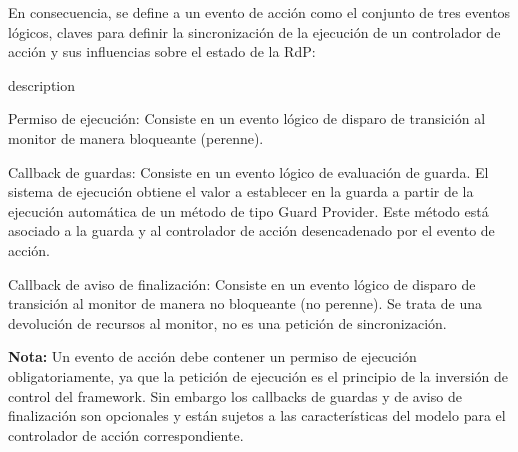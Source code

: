 En consecuencia, se define a un evento de acción como el conjunto de tres
eventos lógicos, claves para definir la sincronización de la ejecución de un
controlador de acción y sus influencias sobre el estado de la RdP:
\begin{labeling}{description}
  \item [Permiso de ejecución: ] Consiste en un evento lógico de disparo
  de transición al monitor de manera bloqueante (perenne).
  \item [Callback de guardas: ] Consiste en un evento lógico de evaluación de
  guarda. El sistema de ejecución obtiene el valor a establecer en la guarda a
  partir de la ejecución automática de un método de tipo Guard Provider. Este
  método está asociado a la guarda y al controlador de acción desencadenado por
  el evento de acción.
  \item [Callback de aviso de finalización: ]
  Consiste en un evento lógico de disparo de transición al monitor de manera no
  bloqueante (no perenne). Se trata de una devolución de recursos al monitor,
  no es una petición de sincronización.
\end{labeling}

\begin{framed}
\textbf{Nota:} Un evento de acción debe contener un permiso de ejecución
obligatoriamente, ya que la petición de ejecución es el principio de la
inversión de control del framework. Sin embargo los callbacks de guardas y de
aviso de finalización son opcionales y están sujetos a las características del
modelo para el controlador de acción correspondiente.
\end{framed}

